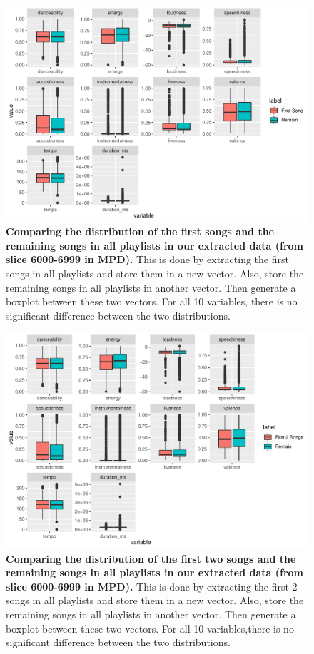 \documentclass[12pt]{article}
\theoremstyle{plain}
\theoremstyle{definition}
\theoremstyle{remark}
\begin{document}
\begin{figure}[htp]
    \centering
    \includegraphics[width=\textwidth]{Images/1st.pdf}
    \caption{\textbf{Comparing the distribution of the first songs and the remaining songs in all playlists in our extracted data (from slice 6000-6999 in MPD).} This is done by extracting the first songs in all playlists and store them in a new vector. Also, store the remaining songs in all playlists in another vector. Then generate a boxplot between these two vectors. For all 10 variables, there is no significant difference between the two distributions.}
    \label{fig:1st}
\end{figure}

\begin{figure}[htp]
    \centering
    \includegraphics[width=\textwidth]{Images/1st2.pdf}
    \caption{\textbf{Comparing the distribution of the first two songs and the remaining songs in all playlists in our extracted data (from slice 6000-6999 in MPD).} This is done by extracting the first 2 songs in all playlists and store them in a new vector. Also, store the remaining songs in all playlists in another vector. Then generate a boxplot between these two vectors. For all 10 variables,there is no significant difference between the two distributions. }
    \label{fig:1st2}
\end{figure}
\end{document}
